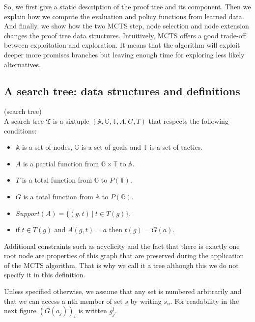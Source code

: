 \documentclass[runningheads,a4paper,draft]{svjour3}
\begin{document}
So, we first give a static description of the proof tree and its component.
Then we explain how we compute the evaluation and policy functions from learned 
data. And finally, we show how the two MCTS step, node selection and node 
extension changes the proof tree data structures.
Intuitively, MCTS offers a good trade-off between exploitation and exploration. 
It means that the algorithm will exploit deeper more promises branches but 
leaving enough time for exploring less likely alternatives.

\subsection{A search tree: data structures and definitions}

\begin{definition}(search tree)\\
A search tree $\mathfrak{T}$ is a sixtuple 
$(\mathbb{A},\mathbb{G},\mathbb{T},A,G,T)$ 
that respects the following conditions:
\begin{itemize}
\item $\mathbb{A}$ is a set of nodes, $\mathbb{G}$ is a set of goals 
 and $\mathbb{T}$ is a set of tactics.
\item $A$ is a partial function from $\mathbb{G} \times \mathbb{T}$ to 
$\mathbb{A}$.
\item $T$ is a total function from $\mathbb{G}$ to $P(\mathbb{T})$.
\item $G$ is a total function from $\mathbb{A}$ to $P(\mathbb{G})$.
\item $Support(A) = \lbrace (g,t)\ |\ t \in T(g) \rbrace$.
\item if $t \in T(g)$ and $A(g,t) = a$ then $t(g) = G(a)$.
\end{itemize}

Additional constraints such as acyclicity and the fact that there is exactly 
one root node are properties of this graph that are preserved during the 
application of the MCTS algorithm. That is why we call it a tree although this 
we do not specify it in this definition.
\end{definition}

Unless specified otherwise, we assume that any set is numbered arbitrarily and 
that we can access a nth member of set 
$s$ by writing $s_n$. For readability in the next figure $(G(a_j))_i$ is 
written $g_j^i$.
\end{document}
